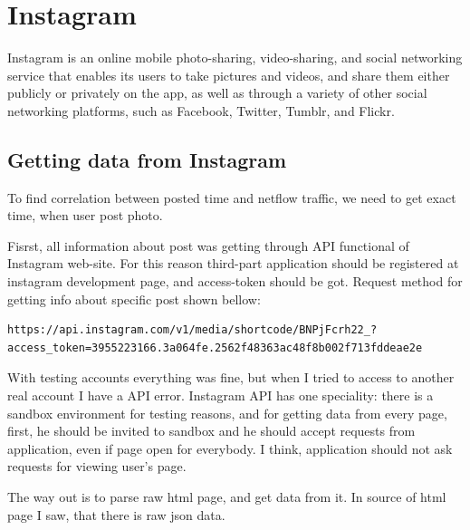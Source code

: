 \section{Instagram}

Instagram is an online mobile photo-sharing, video-sharing, and social networking service that enables its users to take pictures and videos, and share them either publicly or privately on the app, as well as through a variety of other social networking platforms, such as Facebook, Twitter, Tumblr, and Flickr. \cite{instagram1}

\subsection{Getting data from Instagram}

To find correlation between posted time and netflow traffic, we need to get exact time, when user post photo.

Fisrst, all information about post was getting through API functional of Instagram web-site. For this reason third-part application should be registered at instagram development page, and access-token should be got. Request method for getting info about specific post shown bellow:

\begin{lstlisting}
https://api.instagram.com/v1/media/shortcode/BNPjFcrh22_?access_token=3955223166.3a064fe.2562f48363ac48f8b002f713fddeae2e
\end{lstlisting}

With testing accounts everything was fine, but when I tried to access to another real account I have a API error. Instagram API has one speciality: there is a sandbox environment for testing reasons, and for getting data from every page, first, he should be invited to sandbox and he should accept requests from application, even if page open for everybody. I think, application should not ask requests for viewing user's page. 

The way out is to parse raw html page, and get data from it. In source of html page I saw, that there is raw json data.

\begin{figure}[H]
\end{figure}

